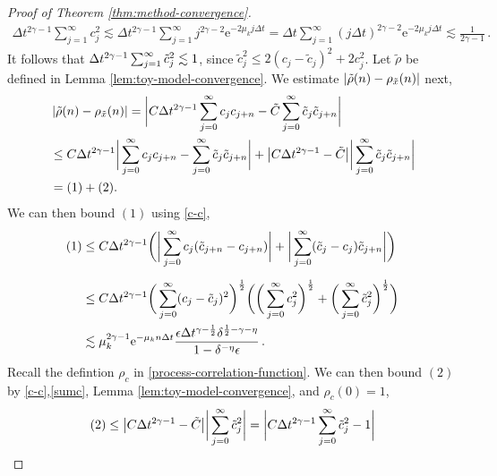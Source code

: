 \documentclass[12pt]{article} %
\begin{document}
\begin{proof}[Proof of Theorem \ref{thm:method-convergence}]
\begin{align}\label{sumc}
\Delta t^{2 \gamma - 1} \sum_{j = 1}^\infty c_j^2 \lesssim \Delta t^{2 \gamma - 1} \sum_{j = 1}^\infty j^{2 \gamma - 2} \mathrm{e}^{- 2 \mu_k j\Delta t} = \Delta t \sum_{j = 1}^\infty (j\Delta t )^{2 \gamma - 2} \mathrm{e}^{- 2 \mu_k j\Delta t} \lesssim %
\tfrac 1{2\gamma-1} \, .
\end{align}
It follows that $\Delta t^{2 \gamma - 1} \sum_{j = 1}^\infty \Tilde{c}_j^2 \lesssim 1$, since $\tilde c^2_j\leq 2(c_j-\tilde c_j)^2+2 c^2_j$.
Let $\tilde{\rho}$ be defined in Lemma \ref{lem:toy-model-convergence}. We estimate $\left|\Tilde{\rho}(n) - \rho_{\Tilde{x}}(n) \right|$ next,
\begin{align*}
%
&\left|\Tilde{\rho}(n) - \rho_{\Tilde{x}}(n) \right| =
\bigg|C \Delta t^{2 \gamma - 1} \sum_{j = 0}^{\infty} c_j c_{j + n} -  \Tilde{C} \sum_{j = 0}^{\infty} \Tilde{c}_j \Tilde{c}_{j + n} \bigg|\\
& \leq C \Delta t^{2 \gamma - 1} \bigg|\sum_{j = 0}^{\infty} c_j c_{j + n} -  \sum_{j = 0}^{\infty} \Tilde{c}_j \Tilde{c}_{j + n} \bigg| + \big| C \Delta t^{2 \gamma - 1} - \Tilde{C} \big| \bigg| \sum_{j = 0}^\infty \Tilde{c}_j \Tilde{c}_{j + n} \bigg| \\
& = (1) + (2).
\end{align*}
 We can then bound $(1)$ using \eqref{c-c},
\begin{align*}
%
(1) & %
\leq C \Delta t^{2 \gamma - 1} \bigg(\bigg|\sum_{j = 0}^{\infty} c_j (\Tilde{c}_{j + n} - c_{j + n}) \bigg| +  \bigg| \sum_{j = 0}^{\infty} (\Tilde{c}_j - c_j) \Tilde{c}_{j + n} \bigg| \bigg) \\[0.2cm]
& \leq C \Delta t^{2 \gamma - 1} \bigg(\sum_{j = 0}^{\infty} (c_j - \Tilde{c}_j)^2\bigg)^{\frac12} \bigg( \bigg(\sum_{j = 0}^\infty c_j^2\bigg)^{\frac12} + \bigg(\sum_{j = 0}^\infty \Tilde{c}_j^2\bigg)^{\frac12}\bigg) \\& 
\lesssim \mu_k^{2 \gamma - 1} \mathrm{e}^{- \mu_k  n\Delta t } \frac{\epsilon \Delta t^{\gamma - \frac{1}{2}} \delta^{ \frac{1}{2} -\gamma - \eta}}{1 - \delta^{-\eta} \epsilon} \, .
\end{align*}
Recall the defintion $\rho_c$ in \eqref{process-correlation-function}.  We can then bound $(2)$ by  \eqref{c-c},\eqref{sumc}, Lemma \ref{lem:toy-model-convergence}, and $\rho_c(0)=1$,
\begin{align*}
(2) &\leq \big| C \Delta t^{2 \gamma - 1} - \Tilde{C} \big| \bigg| \sum_{j = 0}^\infty \Tilde{c}_j^2 \bigg| = \bigg| C \Delta t^{2 \gamma - 1} \sum_{j = 0}^\infty \Tilde{c}_j^2 - 1 \bigg| \\

\end{align*}
\end{proof}
\end{document}
